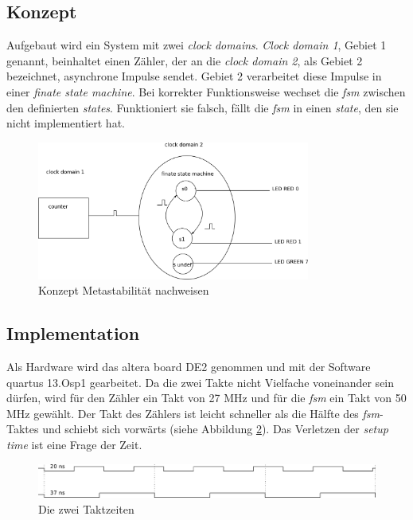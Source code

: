 \subsection{Konzept}\label{sect.metastabil_ansatz}

Aufgebaut wird ein System mit zwei \textit{clock domains}.  \textit{Clock domain 1}, Gebiet 1 genannt,  beinhaltet einen Zähler, der an die \textit{clock domain 2}, als Gebiet 2 bezeichnet, asynchrone Impulse sendet. Gebiet 2 verarbeitet diese Impulse in einer \textit{finate state machine}. Bei korrekter Funktionsweise wechset die \textit{fsm} zwischen den definierten \textit{states}. Funktioniert sie falsch, fällt die \textit{fsm} in einen \textit{state}, den sie nicht implementiert hat.

\begin{figure}[H]
	\includegraphics[width=0.8\textwidth]{images/metastability/konzept.png}
	\caption{Konzept Metastabilität nachweisen}
	\label{fig.metastabil.fsm}
\end{figure}

\subsection{Implementation}\label{sect.metastabil_implementation}

Als Hardware wird das altera board DE2 genommen und mit der Software quartus 13.Osp1 gearbeitet. Da die zwei Takte nicht Vielfache voneinander sein dürfen, wird für den Zähler ein Takt von 27 MHz und für die \textit{fsm} ein Takt von 50 MHz gewählt. Der Takt des Zählers ist leicht schneller als die Hälfte des \textit{fsm}-Taktes und schiebt sich  vorwärts (siehe Abbildung \ref{fig.metastabil.takte}). Das Verletzen der \textit{setup time} ist eine Frage der Zeit.

\begin{figure}[H]
	\includegraphics[width=1\textwidth]{images/metastability/2_takte.png}
	\caption{Die zwei Taktzeiten}
	\label{fig.metastabil.takte}
\end{figure}

